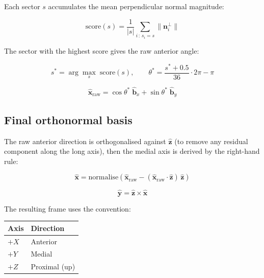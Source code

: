 \documentclass[11pt, a4paper]{article}
\begin{document}
Each sector $s$ accumulates the mean perpendicular normal magnitude:

\begin{equation}
  \mathrm{score}(s) = \frac{1}{|s|} \sum_{i\,:\,s_i = s} \|\bm{n}_i^\perp\|
\end{equation}

The sector with the highest score gives the raw anterior angle:

\begin{equation}
  s^* = \arg\max_s\; \mathrm{score}(s),
  \qquad
  \theta^* = \frac{s^* + 0.5}{36} \cdot 2\pi - \pi
\end{equation}

\begin{equation}
  \hat{\bm{x}}_{\mathrm{raw}} =
    \cos\theta^*\;\hat{\bm{b}}_x + \sin\theta^*\;\hat{\bm{b}}_y
\end{equation}

\subsection{Final orthonormal basis}

The raw anterior direction is orthogonalised against $\hat{\bm{z}}$ (to remove
any residual component along the long axis), then the medial axis is derived by
the right-hand rule:

\begin{equation}
  \hat{\bm{x}} = \mathrm{normalise}\!\left(
    \hat{\bm{x}}_{\mathrm{raw}}
    - (\hat{\bm{x}}_{\mathrm{raw}} \cdot \hat{\bm{z}})\,\hat{\bm{z}}
  \right)
\end{equation}

\begin{equation}
  \hat{\bm{y}} = \hat{\bm{z}} \times \hat{\bm{x}}
\end{equation}

The resulting frame uses the convention:

\begin{center}
\begin{tabular}{ll}
  \toprule
  Axis & Direction \\
  \midrule
  $+X$ & Anterior \\
  $+Y$ & Medial   \\
  $+Z$ & Proximal (up) \\
  \bottomrule
\end{tabular}
\end{center}

\end{document}
